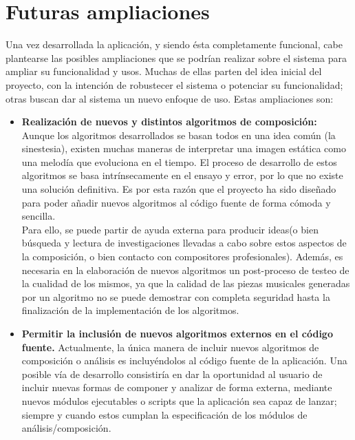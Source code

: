 \section{Futuras ampliaciones}
\label{sec:ampliaciones}

Una vez desarrollada la aplicación, y siendo ésta completamente funcional, cabe plantearse las posibles ampliaciones que se podrían realizar sobre el sistema para ampliar su funcionalidad y usos. Muchas de ellas parten del idea inicial del proyecto, con la intención de robustecer el sistema o potenciar su funcionalidad; otras buscan dar al sistema un nuevo enfoque de uso. Estas ampliaciones son:

\begin{itemize}

\item\textbf{Realización de nuevos y distintos algoritmos de composición:} Aunque los algoritmos desarrollados se basan todos en una idea común (la sinestesia), existen muchas maneras de interpretar una imagen estática como una melodía que evoluciona en el tiempo. El proceso de desarrollo de estos algoritmos se basa intrínsecamente en el ensayo y error, por lo que no existe una solución definitiva. Es por esta razón que el proyecto ha sido diseñado para poder añadir nuevos algoritmos al código fuente de forma cómoda y sencilla.\\

Para ello, se puede partir de ayuda externa para producir ideas(o bien búsqueda y lectura de investigaciones llevadas a cabo sobre estos aspectos de la composición, o bien contacto con compositores profesionales). Además, es necesaria en la elaboración de nuevos algoritmos un post-proceso de testeo de la cualidad de los mismos, ya que la calidad de las piezas musicales generadas por un algoritmo no se puede demostrar con completa seguridad hasta la finalización de la implementación de los algoritmos.

\item\textbf{Permitir la inclusión de nuevos algoritmos externos en el código fuente.} Actualmente, la única manera de incluir nuevos algoritmos de composición o análisis es incluyéndolos al código fuente de la aplicación. Una posible vía de desarrollo consistiría en dar la oportunidad al usuario de incluir nuevas formas de componer y analizar de forma externa, mediante nuevos módulos ejecutables o scripts que la aplicación sea capaz de lanzar; siempre y cuando estos cumplan la especificación de los módulos de análisis/composición.\\


\end{itemize}
